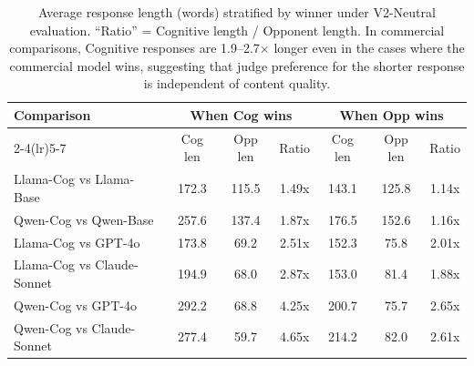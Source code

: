 \begin{table}[t]
\centering\small
\begin{tabular}{lcccccc}
\toprule
\multirow{2}{*}{Comparison} & \multicolumn{3}{c}{When Cog wins} & \multicolumn{3}{c}{When Opp wins} \\
\cmidrule(lr){2-4}\cmidrule(lr){5-7}
& Cog len & Opp len & Ratio & Cog len & Opp len & Ratio \\
\midrule
Llama-Cog vs Llama-Base & 172.3 & 115.5 & 1.49x & 143.1 & 125.8 & 1.14x \\
Qwen-Cog vs Qwen-Base & 257.6 & 137.4 & 1.87x & 176.5 & 152.6 & 1.16x \\
Llama-Cog vs GPT-4o & 173.8 & 69.2 & 2.51x & 152.3 & 75.8 & 2.01x \\
Llama-Cog vs Claude-Sonnet & 194.9 & 68.0 & 2.87x & 153.0 & 81.4 & 1.88x \\
Qwen-Cog vs GPT-4o & 292.2 & 68.8 & 4.25x & 200.7 & 75.7 & 2.65x \\
Qwen-Cog vs Claude-Sonnet & 277.4 & 59.7 & 4.65x & 214.2 & 82.0 & 2.61x \\
\bottomrule
\end{tabular}
\caption{Average response length (words) stratified by winner under V2-Neutral evaluation. ``Ratio'' = Cognitive length / Opponent length. In commercial comparisons, Cognitive responses are 1.9--2.7$\times$ longer even in the cases where the commercial model wins, suggesting that judge preference for the shorter response is independent of content quality.}
\label{tab:winner_length}
\end{table}

